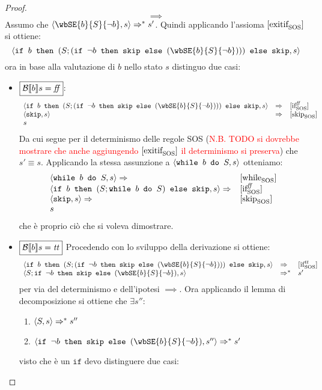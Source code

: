 {\begin{enumerate}
\begin{proof}
$$
\boxed{\implies}
$$
Assumo che $\confSs{\wbSE{b}{S}{\neg b}}{s} \Rar{*} s'$.
Quindi applicando l'assioma $ [ \textrm{\normalfont{exitif}} ^ \textrm{\normalfont{}} _\textrm{\normalfont{SOS}} ] $ si ottiene:
$$
\confSs{\ifABC{b}{(S; (\ifABC{\neg b}{\skipForFriends}{(\wbSE{b}{S}{\neg b})}))}{\skipForFriends}}{s}
$$
ora in base alla valutazione di $b$ nello stato $s$ distinguo due casi:
\begin{itemize}
	\item $\boxed{\mathcal{B} \llbracket b \rrbracket s = \mbox{\textit{ff}}}$:
	$$
	\begin{array}{lll}
	\confSs{\ifABC{b}{(S; (\ifABC{\neg b}{\skipForFriends}{(\wbSE{b}{S}{\neg b})}))}{\skipForFriends}}{s} & \Rar{} & \ifffSOS \\
	\confSs{\skipForFriends}{s} & \Rar{}& \skipSOS \\
	s
	\end{array}
	$$
	Da cui segue per il determinismo delle regole SOS (\textcolor{red}{N.B. TODO si dovrebbe mostrare che anche aggiungendo
	$ [ \textrm{\normalfont{exitif}} ^ \textrm{\normalfont{}} _\textrm{\normalfont{SOS}} ] $ il determinismo si preserva}) che $s' \equiv s$.
	Applicando la stessa assunzione a $\langle{}\mbox{\normalfont{\texttt{while }}} b \textrm{\normalfont{\texttt{ do }}} S, s\rangle{}$ otteniamo:
	$$
	\begin{array}{ll}
	\langle{}\mbox{\normalfont{\texttt{while }}} b \textrm{\normalfont{\texttt{ do }}} S, s\rangle{} \Rightarrow^{}&  [ \textrm{\normalfont{while}} ^ \textrm{\normalfont{}} _\textrm{\normalfont{SOS}} ]  \\
	\langle{}\mbox{\normalfont{\texttt{if }}} b \textrm{\normalfont{\texttt{ then }}} (S; \mbox{\normalfont{\texttt{while }}} b \textrm{\normalfont{\texttt{ do }}} S) \textrm{\normalfont{\texttt{ else }}} \textrm{\normalfont{\texttt{skip}}}, s\rangle{} \Rightarrow^{} &  [ \textrm{\normalfont{if}} ^ \textrm{\normalfont{\ensuremath{\mbox{\textit{ff}}}}} _\textrm{\normalfont{SOS}} ]  \\ 
	\langle{}\textrm{\normalfont{\texttt{skip}}}, s\rangle{} \Rightarrow^{}&  [ \textrm{\normalfont{skip}} ^ \textrm{\normalfont{}} _\textrm{\normalfont{SOS}} ]  \\
	s
	\end{array}
	$$
	che è proprio ciò che si voleva dimostrare.
	\item $\boxed{\mathcal{B} \llbracket b \rrbracket s = \mbox{\textit{tt}}}$
	Procedendo con lo sviluppo della derivazione si ottiene:
	$$
	\begin{array}{lll}
	\confSs{\ifABC{b}{(S; (\ifABC{\neg b}{\skipForFriends}{(\wbSE{b}{S}{\neg b})}))}{\skipForFriends}}{s} & \Rar{} & \ifttSOS \\
	\confSs{S; \ifABC{\neg b}{\skipForFriends}{(\wbSE{b}{S}{\neg b})}}{s} & \Rar{*} & s'\\
	\end{array}
	$$
	per via del determinismo e dell'ipotesi $\implies$.
	Ora applicando il lemma di decomposizione si ottiene che $\exists s''$:
	\begin{enumerate}
	\item $\langle{}S, s\rangle{} \Rightarrow^{*} s''$
	\label{hw6:Ssgoestos''}
	\item $\confSs{\ifABC{\neg b}{\skipForFriends}{(\wbSE{b}{S}{\neg b})}}{s''} \Rar{*} s'$
	\label{hw6:ifnegb}
	\end{enumerate}
	visto che è un $\texttt{if}$ devo distinguere due casi:

\end{itemize}
\end{proof}
\end{enumerate}}
